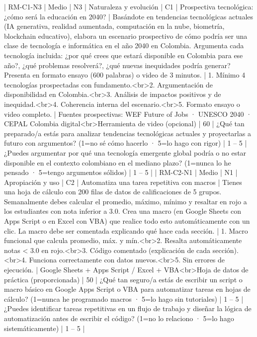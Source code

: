 | RM-C1-N3 | Medio | N3 | Naturaleza y evolución | C1 | Prospectiva tecnológica: ¿cómo será la educación en 2040? | Basándote en tendencias tecnológicas actuales (IA generativa, realidad aumentada, computación en la nube, biometría, blockchain educativo), elabora un escenario prospectivo de cómo podría ser una clase de tecnología e informática en el año 2040 en Colombia. Argumenta cada tecnología incluida: ¿por qué crees que estará disponible en Colombia para ese año?, ¿qué problemas resolverá?, ¿qué nuevas inequidades podría generar? Presenta en formato ensayo (600 palabras) o video de 3 minutos. | 1. Mínimo 4 tecnologías prospectadas con fundamento.<br>2. Argumentación de disponibilidad en Colombia.<br>3. Análisis de impactos positivos y de inequidad.<br>4. Coherencia interna del escenario.<br>5. Formato ensayo o video completo. | Fuentes prospectivas: WEF Future of Jobs · UNESCO 2040 · CEPAL Colombia digital<br>Herramienta de video (opcional) | 60 | ¿Qué tan preparado/a estás para analizar tendencias tecnológicas actuales y proyectarlas a futuro con argumentos? (1=no sé cómo hacerlo · 5=lo hago con rigor) | 1 – 5 | ¿Puedes argumentar por qué una tecnología emergente global podría o no estar disponible en el contexto colombiano en el mediano plazo? (1=nunca lo he pensado · 5=tengo argumentos sólidos) | 1 – 5 |
| RM-C2-N1 | Medio | N1 | Apropiación y uso | C2 | Automatiza una tarea repetitiva con macros | Tienes una hoja de cálculo con 200 filas de datos de calificaciones de 5 grupos. Semanalmente debes calcular el promedio, máximo, mínimo y resaltar en rojo a los estudiantes con nota inferior a 3.0. Crea una macro (en Google Sheets con Apps Script o en Excel con VBA) que realice todo esto automáticamente con un clic. La macro debe ser comentada explicando qué hace cada sección. | 1. Macro funcional que calcula promedio, máx. y mín.<br>2. Resalta automáticamente notas < 3.0 en rojo.<br>3. Código comentado (explicación de cada sección).<br>4. Funciona correctamente con datos nuevos.<br>5. Sin errores de ejecución. | Google Sheets + Apps Script / Excel + VBA<br>Hoja de datos de práctica (proporcionada) | 50 | ¿Qué tan seguro/a estás de escribir un script o macro básico en Google Apps Script o VBA para automatizar tareas en hojas de cálculo? (1=nunca he programado macros · 5=lo hago sin tutoriales) | 1 – 5 | ¿Puedes identificar tareas repetitivas en un flujo de trabajo y diseñar la lógica de automatización antes de escribir el código? (1=no lo relaciono · 5=lo hago sistemáticamente) | 1 – 5 |
